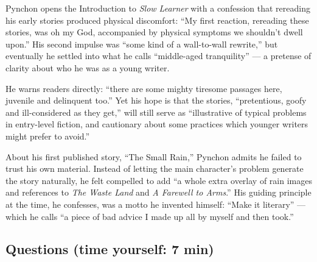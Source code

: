 \documentclass[10pt,a4paper]{article}
\begin{document}
\begin{tcolorbox}[colback=white, colframe=black]
\small
Pynchon opens the Introduction to \emph{Slow Learner} with a
confession that rereading his early stories produced physical
discomfort: ``My first reaction, rereading these stories, was oh my
God, accompanied by physical symptoms we shouldn't dwell upon.'' His
second impulse was ``some kind of a wall-to-wall rewrite,'' but
eventually he settled into what he calls ``middle-aged tranquility''
--- a pretense of clarity about who he was as a young writer.

He warns readers directly: ``there are some mighty tiresome passages
here, juvenile and delinquent too.'' Yet his hope is that the
stories, ``pretentious, goofy and ill-considered as they get,'' will
still serve as ``illustrative of typical problems in entry-level
fiction, and cautionary about some practices which younger writers
might prefer to avoid.''

About his first published story, ``The Small Rain,'' Pynchon admits
he failed to trust his own material. Instead of letting the main
character's problem generate the story naturally, he felt compelled
to add ``a whole extra overlay of rain images and references to
\emph{The Waste Land} and \emph{A Farewell to Arms}.'' His guiding
principle at the time, he confesses, was a motto he invented himself:
``Make it literary'' --- which he calls ``a piece of bad advice I
made up all by myself and then took.''
\end{tcolorbox}

\subsection*{Questions (time yourself: 7 min)}
\end{document}
